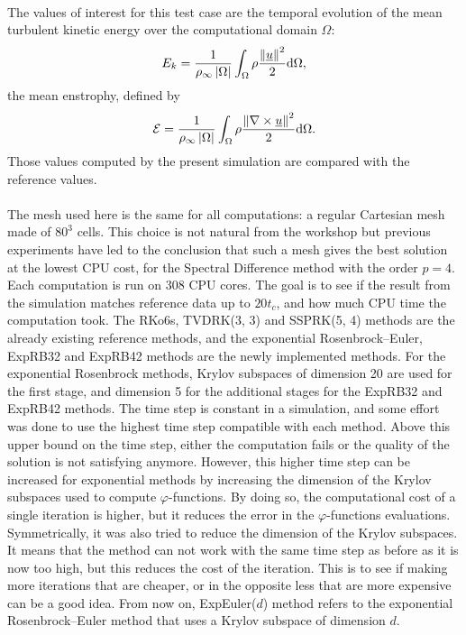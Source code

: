       \paragraph{}
      The values of interest for this test case are the temporal evolution of the mean turbulent kinetic energy over the computational domain $\Omega$:
      \begin{equation}
        E_k = \frac{1}{\rho_\infty \left|\Omega\right|} \int_\Omega \rho \frac{\norm{\vec{u}}^2}{2} \mathrm{d}\Omega ,
      \end{equation}
      the mean enstrophy, defined by
      \begin{equation}
        \mathcal{E} = \frac{1}{\rho_\infty \left|\Omega\right|} \int_\Omega \rho \frac{\norm{\nabla \times \vec{u}}^2}{2} \mathrm{d}\Omega .
      \end{equation}
      Those values computed by the present simulation are compared with the reference values.

      \paragraph{}
      The mesh used here is the same for all computations: a regular Cartesian mesh made of $80^3$ cells.
      This choice is not natural from the workshop but previous experiments have led to the conclusion that such a mesh gives the best solution at the lowest CPU cost, for the Spectral Difference method with the order $p = 4$.
      Each computation is run on 308 CPU cores.
      The goal is to see if the result from the simulation matches reference data up to $20 t_c$, and how much CPU time the computation took.
      The RKo6s, TVDRK(3, 3) and SSPRK(5, 4) methods are the already existing reference methods, and the exponential Rosenbrock--Euler, ExpRB32 and ExpRB42 methods are the newly implemented methods.
      For the exponential Rosenbrock methods, Krylov subspaces of dimension 20 are used for the first stage, and dimension 5 for the additional stages for the ExpRB32 and ExpRB42 methods.
      The time step is constant in a simulation, and some effort was done to use the highest time step compatible with each method.
      Above this upper bound on the time step, either the computation fails or the quality of the solution is not satisfying anymore.
      However, this higher time step can be increased for exponential methods by increasing the dimension of the Krylov subspaces used to compute $\varphi$-functions.
      By doing so, the computational cost of a single iteration is higher, but it reduces the error in the $\varphi$-functions evaluations.
      Symmetrically, it was also tried to reduce the dimension of the Krylov subspaces.
      It means that the method can not work with the same time step as before as it is now too high, but this reduces the cost of the iteration.
      This is to see if making more iterations that are cheaper, or in the opposite less that are more expensive can be a good idea.
      From now on, ExpEuler($d$) method refers to the exponential Rosenbrock--Euler method that uses a Krylov subspace of dimension $d$.

